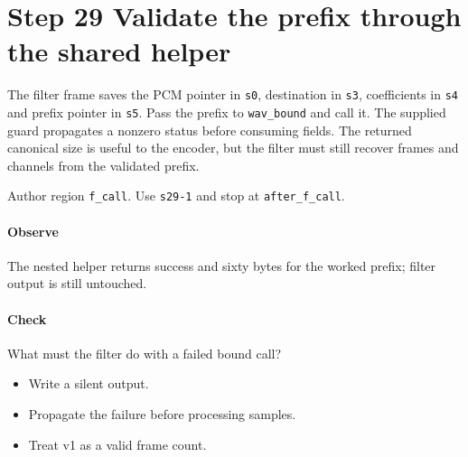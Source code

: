 \section{Step 29 Validate the prefix through the shared helper}\label{pcm-wav-s29}
The filter frame saves the PCM pointer in \texttt{s0}, destination in \texttt{s3}, coefficients in \texttt{s4} and prefix pointer in \texttt{s5}. Pass the prefix to \texttt{wav\_bound} and call it. The supplied guard propagates a nonzero status before consuming fields. The returned canonical size is useful to the encoder, but the filter must still recover frames and channels from the validated prefix.

Author region \texttt{f\_call}. Use \texttt{s29-1} and stop at \texttt{after\_f\_call}.

\paragraph{Observe} The nested helper returns success and sixty bytes for the worked prefix; filter output is still untouched.

\paragraph{Check} What must the filter do with a failed bound call?
\begin{itemize}
  \item[A.] Write a silent output.
  \item[B.] Propagate the failure before processing samples.
  \item[C.] Treat v1 as a valid frame count.
\end{itemize}
